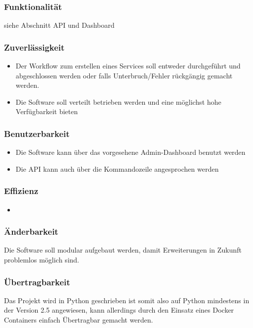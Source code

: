 \documentclass[11pt]{scrartcl}
\begin{document}
\subsubsection{Funktionalität}
siehe Abschnitt API und Dashboard
\subsubsection{Zuverlässigkeit}
\begin{itemize}
  \item Der Workflow zum erstellen eines Services soll entweder durchgeführt und 
  abgeschlossen werden oder falls Unterbruch/Fehler rückgängig gemacht 
  werden.
  \item Die Software soll verteilt betrieben werden und eine möglichst hohe 
  Verfügbarkeit bieten
\end{itemize}
\subsubsection{Benutzerbarkeit}
\begin{itemize}
  \item Die Software kann über das vorgesehene Admin-Dashboard benutzt werden
  \item Die API kann auch über die Kommandozeile angesprochen werden
\end{itemize}
\subsubsection{Effizienz}
\begin{itemize}
  \item 
\end{itemize}
\subsubsection{Änderbarkeit}
Die Software soll modular aufgebaut werden, damit Erweiterungen in Zukunft 
problemlos möglich sind.
\subsubsection{Übertragbarkeit}
Das Projekt wird in Python geschrieben ist somit also auf Python mindestens in der Version 2.5 angewiesen, 
kann allerdings durch den Einsatz eines Docker Containers einfach Übertragbar 
gemacht werden.
\end{document}
